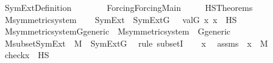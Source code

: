 %
\begin{isabellebody}%
%
%
\isadelimtheory
%
\endisadelimtheory
%
\isatagtheory
{}\isamarkupfalse%
\ SymExt{\isacharunderscore}{\kern0pt}Definition\isanewline
\ \ \ \isanewline
\ \ \ \ {\isachardoublequoteopen}Forcing{\isacharslash}{\kern0pt}Forcing{\isacharunderscore}{\kern0pt}Main{\isachardoublequoteclose}\ \isanewline
\ \ \ \ HS{\isacharunderscore}{\kern0pt}Theorems\isanewline
{}%
\endisatagtheory
{\isafoldtheory}%
%
\isadelimtheory
\ \isanewline
%
\endisadelimtheory
\isanewline
{}\isamarkupfalse%
\ M{\isacharunderscore}{\kern0pt}symmetric{\isacharunderscore}{\kern0pt}system\ \isanewline
{}\ \isanewline
\isanewline
{}\isamarkupfalse%
\ SymExt\ \ {\isachardoublequoteopen}SymExt{\isacharparenleft}{\kern0pt}G{\isacharparenright}{\kern0pt}\ {\isasymequiv}\ {\isacharbraceleft}{\kern0pt}\ val{\isacharparenleft}{\kern0pt}G{\isacharcomma}{\kern0pt}\ x{\isacharparenright}{\kern0pt}{\isachardot}{\kern0pt}\ x\ {\isasymin}\ HS\ {\isacharbraceright}{\kern0pt}{\isachardoublequoteclose}\ \isanewline
\isanewline
{}\isamarkupfalse%
\ \isanewline
\isanewline
\isanewline
{}\isamarkupfalse%
\ M{\isacharunderscore}{\kern0pt}symmetric{\isacharunderscore}{\kern0pt}system{\isacharunderscore}{\kern0pt}G{\isacharunderscore}{\kern0pt}generic\ {\isacharequal}{\kern0pt}\ M{\isacharunderscore}{\kern0pt}symmetric{\isacharunderscore}{\kern0pt}system\ {\isacharplus}{\kern0pt}\ G{\isacharunderscore}{\kern0pt}generic\isanewline
{}\isanewline
\isanewline
{}\isamarkupfalse%
\ M{\isacharunderscore}{\kern0pt}subset{\isacharunderscore}{\kern0pt}SymExt\ {\isacharcolon}{\kern0pt}\ {\isachardoublequoteopen}M\ {\isasymsubseteq}\ SymExt{\isacharparenleft}{\kern0pt}G{\isacharparenright}{\kern0pt}{\isachardoublequoteclose}\ \isanewline
%
\isadelimproof
%
\endisadelimproof
%
\isatagproof
{}\isamarkupfalse%
\ {\isacharparenleft}{\kern0pt}rule\ subsetI{\isacharparenright}{\kern0pt}\isanewline
\ \ \isamarkupfalse%
\ x\ \isamarkupfalse%
\ assms\ {\isacharcolon}{\kern0pt}\ {\isachardoublequoteopen}x\ {\isasymin}\ M{\isachardoublequoteclose}\ \isanewline
\ \ \isamarkupfalse%
\ \isamarkupfalse%
\ {\isachardoublequoteopen}check{\isacharparenleft}{\kern0pt}x{\isacharparenright}{\kern0pt}\ {\isasymin}\ HS{\isachardoublequoteclose}\ \isamarkupfalse%

\end{isabellebody}
